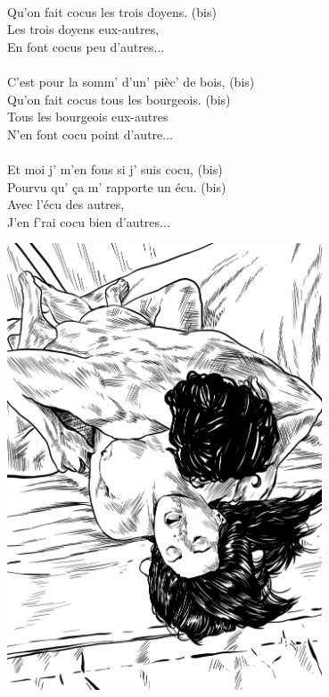 \\Qu'on fait cocus les trois doyens. (bis)
\\Les trois doyens eux-autres,
\\En font cocus peu d'autres...
\\\\C'est pour la somm' d'un' pièc' de bois, (bis)
\\Qu'on fait cocus tous les bourgeois. (bis)
\\Tous les bourgeois eux-autres
\\N'en font cocu point d'autre...
\\\\Et moi j' m'en fous si j' suis cocu, (bis)
\\Pourvu qu' ça m' rapporte un écu. (bis)
\\Avec l'écu des autres,
\\J'en f'rai cocu bien d'autres...
\vspace{0.5cm}
\begin{center}
\includegraphics[width=0.7\textwidth]{images/brev73.png}
\end{center}


\breakpage